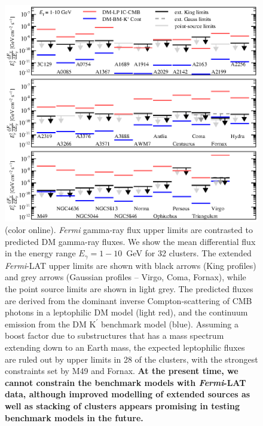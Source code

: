 \documentclass[10pt,aps,pra,reprint,amsmath,amsfonts,amssymb,showpacs,nofootinbib,floatfix]{revtex4-1}
\def\del#1{{}}
\def\C#1{{\bf #1}}
\newcommand{\Fermi}{{\em Fermi}\xspace}
\newcommand{\rmn}{\mathrm}
\newcommand{\Kp}{\rmn{K}^\prime}
\newcommand{\colo}{(color online). }
\begin{document}
\begin{figure}
\begin{minipage}{2.0\columnwidth}
  \includegraphics[width=0.99\columnwidth]{figures/Fermi.comp.DM.eps}
  \caption{\colo \Fermi gamma-ray flux upper limits are contrasted to
    predicted DM gamma-ray fluxes. We show the mean differential flux
    in the energy range $E_\gamma=1-10$~GeV for 32 clusters. The
    extended \Fermi-LAT upper limits are shown with black arrows (King
    profiles) and grey arrows (Gaussian profiles -- Virgo, Coma,
    Fornax), while the point source limits are shown in light
    grey. The predicted fluxes are derived from the dominant inverse
    Compton-scattering of CMB photons in a leptophilic DM model (light
    red), and the continuum emission from the DM $\Kp$ benchmark model
    (blue). Assuming a boost factor due to substructures that has a
    mass spectrum extending down to an Earth mass, the expected
    leptophilic fluxes are ruled out by upper limits in 28 of the
    clusters, with the strongest constraints set by M49 and
    Fornax. \C{At the present time, we cannot constrain the benchmark
      models with \Fermi-LAT data, although improved modelling of
      extended sources as well as stacking of clusters appears
      promising in testing benchmark models in the future.} \del{At
      the present time, we cannot constrain the benchmark models,
      although \Fermi-LAT will soon start to probe these models. In
      particular, improved modelling of extended sources as well as
      stacking of clusters appears promising in testing benchmark
      models.}}
 \label{fig14}
\end{minipage}
\end{figure}
\end{document}
